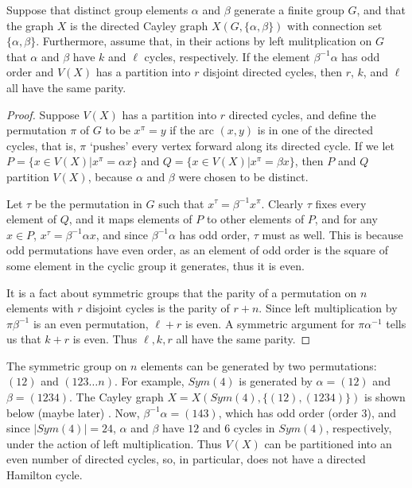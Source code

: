 \begin{theorem}
	Suppose that distinct group elements $\alpha$ and $\beta$ generate a finite group $G$, and that the graph $X$ is the directed Cayley graph $X(G,\{\alpha,\beta\})$ with connection set $\{\alpha,\beta\}$.  Furthermore, assume that, in their actions by left mulitplication on $G$ that $\alpha$ and $\beta$ have $k$ and $\ell$ cycles, respectively.  If the element $\beta^{-1}\alpha$ has odd order and $V(X)$ has a partition into $r$ disjoint directed cycles, then $r$, $k$, and $\ell$ all have the same parity.
\end{theorem}
\begin{proof}
	Suppose $V(X)$ has a partition into $r$ directed cycles, and define the permutation $\pi$ of $G$ to be $x^\pi =y$ if the arc $(x,y)$ is in one of the directed cycles, that is, $\pi$ `pushes' every vertex forward along its directed cycle.  If we let $P=\{x\in V(X)|x^\pi = \alpha x\}$ and $Q=\{ x\in V(X)|x^\pi = \beta x \}$, then $P$ and $Q$ partition $V(X)$, because $\alpha$ and $\beta$ were chosen to be distinct.
	
	Let $\tau$ be the permutation in $G$ such that $x^\tau=\beta^{-1}x^\pi$.  Clearly $\tau$ fixes every element of $Q$, and it maps elements of $P$ to other elements of $P$, and for any $x\in P$, $x^\tau = \beta^{-1}\alpha x$, and since $\beta^{-1}\alpha$ has odd order, $\tau$ must as well.  This is because odd permutations have even order, as an element of odd order is the square of some element in the cyclic group it generates, thus it is even.  
	
	It is a fact about symmetric groups that the parity of a permutation on $n$ elements with $r$ disjoint cycles is the parity of $r+n$.  Since left multiplication by $\pi\beta^{-1}$ is an even permutation, $\ell+r$ is even.  A symmetric argument for $\pi\alpha^{-1}$ tells us that $k+r$ is even.  Thus $\ell,k,r$ all have the same parity.
	
	
\end{proof}


The symmetric group on $n$ elements can be generated by two permutations: $(12)$ and $(123\dots n)$.  For example, $Sym(4)$ is generated by $\alpha=(12)$ and $\beta=(1234)$.  The Cayley graph $X=X(Sym(4),\{(12),(1234)\})$ is shown below (maybe later) %
.  Now, $\beta^{-1}\alpha=(143)$, which has odd order (order $3$), and since $|Sym(4)|=24$, $\alpha$ and $\beta$ have $12$ and $6$ cycles in $Sym(4)$, respectively, under the action of left multiplication.  Thus $V(X)$ can be partitioned into an even number of directed cycles, so, in particular, does not have a directed Hamilton cycle.


